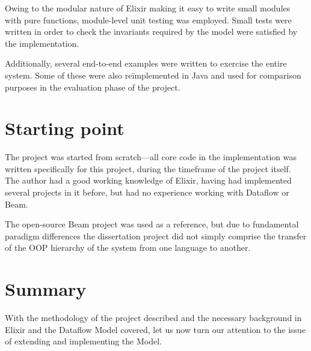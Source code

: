 Owing to the modular nature of Elixir making it easy to write small modules with pure functions, module-level unit testing was employed.
Small tests were written in order to check the invariants required by the model were satisfied by the implementation.


Additionally, several end-to-end examples were written to exercise the entire system.
Some of these were also re\"implemented in Java and used for comparison purposes in the evaluation phase of the project.

\section{Starting point}\label{sec:prep:starting}

The project was started from scratch---all core code in the implementation was written specifically for this project, during the timeframe of the project itself.
The author had a good working knowledge of Elixir, having had implemented several projects in it before, but had no experience working with Dataflow or Beam.

The open-source Beam project was used as a reference, but due to fundamental paradigm differences the dissertation project did not simply comprise the transfer of the OOP hierarchy of the system from one language to another.

\section{Summary}\label{sec:prep:summary}

With the methodology of the project described and the necessary background in Elixir and the Dataflow Model covered, let us now turn our attention to the issue of extending and implementing the Model.
